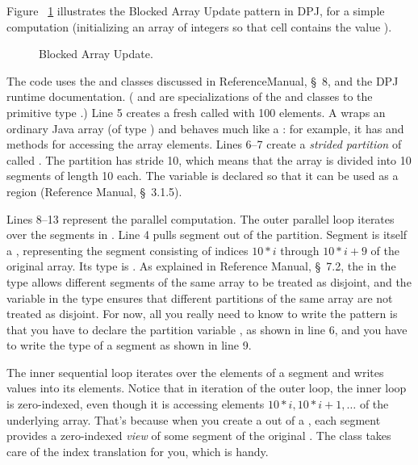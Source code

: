  Figure ~\ref{fig:array:blocked}
illustrates the Blocked Array Update pattern in DPJ, for a simple
computation (initializing an array of integers so that cell 
contains the value ).

\begin{figure}

\caption{Blocked Array Update.}
\label{fig:array:blocked}
\end{figure}

The code uses the  and  classes
discussed in ReferenceManual, \S~8, and the DPJ runtime documentation.
( and  are specializations of
the  and  classes to the primitive
type .)  Line 5 creates a fresh  called
 with 100 elements.  A  wraps an ordinary
Java array (of type ) and behaves much like a
: for example, it has  and 
methods for accessing the array elements.  Lines 6--7 create a
\emph{strided partition} of  called .  The
partition has stride 10, which means that the array is divided into 10
segments of length 10 each.  The variable  is declared
 so that it can be used as a region (Reference Manual,
\S~3.1.5).

Lines 8--13 represent the parallel computation.  The outer parallel
 loop iterates over the segments in .  Line 4
pulls segment  out of the partition.  Segment  is itself
a , representing the segment consisting of indices
$10*i$ through $10*i+9$ of the original array.  Its type is
.  As explained in Reference Manual, \S~7.2,
the \kwd{[i]} in the type allows different segments of the same array
to be treated as disjoint, and the variable  in the type
ensures that different partitions of the same array are not treated as
disjoint.  For now, all you really need to know to write the pattern
is that you have to declare the partition variable 
, as shown in line 6, and you have to write the type of a
segment as shown in line 9.

The inner sequential loop iterates over the elements of a segment and
writes values into its elements.  Notice that in iteration  of
the outer loop, the inner loop is zero-indexed, even though it is
accessing elements $10*i, 10*i+1, \ldots$ of the underlying array.
That's because when you create a  out of a
, each segment provides a zero-indexed \emph{view} of
some segment of the original .  The  class
takes care of the index translation for you, which is handy.

